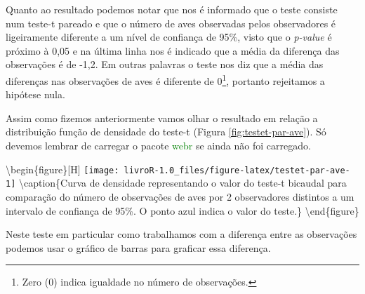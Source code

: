 \documentclass[14pt,titlepage, oneside, openany, a4paper]{book}
\newenvironment{Shaded}{\begin{snugshade}}{\end{snugshade}}
\newcommand{\DataTypeTok}[1]{\textcolor[rgb]{0.13,0.29,0.53}{#1}}
\newcommand{\DecValTok}[1]{\textcolor[rgb]{0.00,0.00,0.81}{#1}}
\newcommand{\FloatTok}[1]{\textcolor[rgb]{0.00,0.00,0.81}{#1}}
\newcommand{\KeywordTok}[1]{\textcolor[rgb]{0.13,0.29,0.53}{\textbf{#1}}}
\newcommand{\NormalTok}[1]{#1}
\newcommand{\OperatorTok}[1]{\textcolor[rgb]{0.81,0.36,0.00}{\textbf{#1}}}
\newcommand{\OtherTok}[1]{\textcolor[rgb]{0.56,0.35,0.01}{#1}}
\newcommand{\StringTok}[1]{\textcolor[rgb]{0.31,0.60,0.02}{#1}}
\begin{document}
Quanto ao resultado podemos notar que nos é informado que o teste consiste num teste-t pareado e que o número de aves observadas pelos observadores é ligeiramente diferente a um nível de confiança de 95\%, visto que o \emph{p-value} é próximo à 0,05 e na última linha nos é indicado que a média da diferença das observações é de -1,2. Em outras palavras o teste nos diz que a média das diferenças nas observações de aves é diferente de 0\footnote{Zero (0) indica igualdade no número de observações.}, portanto rejeitamos a hipótese nula.

Assim como fizemos anteriormente vamos olhar o resultado em relação a distribuição função de densidade do teste-t (Figura \ref{fig:testet-par-ave}). Só devemos lembrar de carregar o pacote \textcolor{green}{webr} se ainda não foi carregado.

\begin{Shaded}
\end{Shaded}

\textbackslash{}begin\{figure\}{[}H{]}
\texttt{[image: livroR-1.0\_files/figure-latex/testet-par-ave-1]} \textbackslash{}caption\{Curva de densidade representando o valor do teste-t bicaudal para comparação do número de observações de aves por 2 observadores distintos a um intervalo de confiança de 95\%. O ponto azul indica o valor do teste.\}\label{fig:testet-par-ave}
\textbackslash{}end\{figure\}

Neste teste em particular como trabalhamos com a diferença entre as observações podemos usar o gráfico de barras para graficar essa diferença.

\begin{Shaded}
\end{Shaded}
\end{document}
